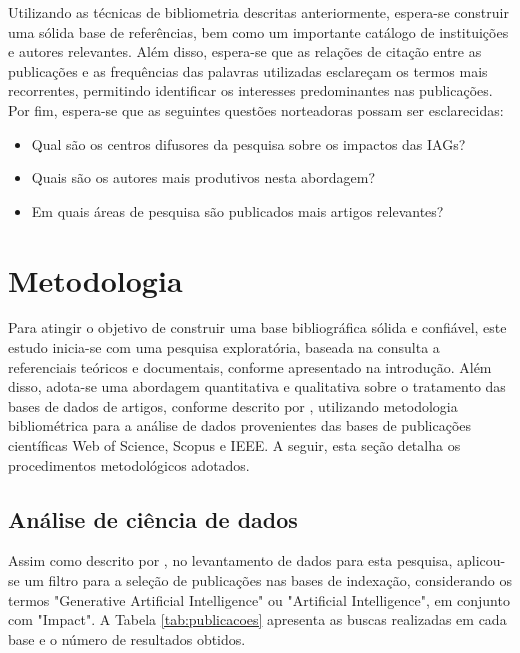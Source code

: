 \documentclass[openany,oneside,a4paper,9pt]{extarticle}
\begin{document}
Utilizando as técnicas de bibliometria descritas anteriormente, espera-se construir uma sólida base de referências, bem como um importante catálogo de instituições e autores relevantes. Além disso, espera-se que as relações de citação entre as publicações e as frequências das palavras utilizadas esclareçam os termos mais recorrentes, permitindo identificar os interesses predominantes nas publicações. Por fim, espera-se que as seguintes questões norteadoras possam ser esclarecidas:

\begin{itemize}
    \item Qual são os centros difusores da pesquisa sobre os impactos das IAGs?
    \item Quais são os autores mais produtivos nesta abordagem?
    \item Em quais áreas de pesquisa são publicados mais artigos relevantes?
\end{itemize}

\section{Metodologia}
\onehalfspacing

Para atingir o objetivo de construir uma base bibliográfica sólida e confiável, este estudo inicia-se com uma pesquisa exploratória, baseada na consulta a referenciais teóricos e documentais, conforme apresentado na introdução. Além disso, adota-se uma abordagem quantitativa e qualitativa sobre o tratamento das bases de dados de artigos, conforme descrito por \textcite{carlosHenrique2010Metodologia, gil2002elaborar}, utilizando metodologia bibliométrica para a análise de dados provenientes das bases de publicações científicas Web of Science, Scopus e IEEE. A seguir, esta seção detalha os procedimentos metodológicos adotados.

\subsection{Análise de ciência de dados}

Assim como descrito por \textcite{zupic2015bibliometric}, no levantamento de dados para esta pesquisa, aplicou-se um filtro para a seleção de publicações nas bases de indexação, considerando os termos "Generative Artificial Intelligence"  ou "Artificial Intelligence", em conjunto com "Impact". A Tabela \ref{tab:publicacoes} apresenta as buscas realizadas em cada base e o número de resultados obtidos.
\end{document}
